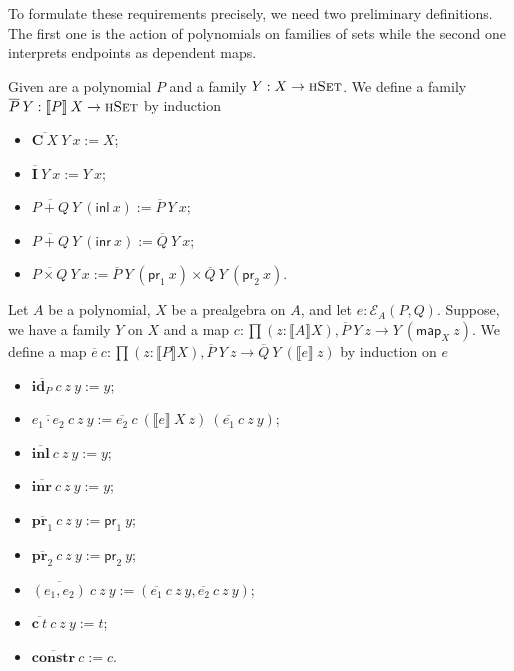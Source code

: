 \documentclass[9pt]{entcs}
\newcommand{\type}[1]{\textsc{#1}}
\newcommand{\term}[1]{\mathsf{#1}}
\newcommand{\constructor}[1]{\mathbf{#1}}
\newcommand{\nattranstxt}[1]{\mathsf{#1}}
\newcommand{\function}[1]{\mathsf{#1}}
\newcommand{\deprod}[3]{\prod(#1 : #2), #3} %
\newcommand{\hset}{\type{hSet}} %
\newcommand{\0}{\textbf{0}} %
\newcommand{\inl}{\term{inl}} %
\newcommand{\inr}{\term{inr}} %
\newcommand{\prl}{\term{pr}_1} %
\newcommand{\prr}{\term{pr}_2} %
\newcommand{\Def}{:=} %
\newcommand{\prlt}{\nattranstxt{pr}_1} %
\newcommand{\prrt}{\nattranstxt{pr}_2} %
\newcommand{\C}{\constructor{C}} %
\newcommand{\I}{\constructor{I}} %
\newcommand{\sumP}[2]{#1 + #2} %
\newcommand{\prodP}[2]{#1 \times #2} %
\newcommand{\ep}[3]{\mathcal{E}_{#1}(#2,#3)} %
\newcommand{\id}[1]{\constructor{id}_{#1}} %
\newcommand{\comp}[2]{#1 \cdot #2} %
\newcommand{\inle}{\constructor{inl}} %
\newcommand{\inre}{\constructor{inr}} %
\newcommand{\prle}{\constructor{pr}_1} %
\newcommand{\prre}{\constructor{pr}_2} %
\newcommand{\pair}[2]{(#1 , #2)} %
\newcommand{\Ce}{\constructor{c}} %
\newcommand{\constr}{\constructor{constr}} %
\newcommand{\semP}[1]{\llbracket #1 \rrbracket} %
\newcommand{\semE}[1]{\llbracket #1 \rrbracket} %
\newcommand{\constrA}[1]{\function{map}_{#1}} %
\newcommand{\polydact}[2]{\overline{#1} \> #2} %
\newcommand{\epdact}[2]{\overline{#1} \> #2} %
\begin{document}
To formulate these requirements precisely, we need two preliminary definitions.
The first one is the action of polynomials on families of sets while the second one interprets endpoints as dependent maps.

\begin{definition}
Given are a polynomial $P$ and a family $Y : X \rightarrow \hset$.
We define a family $\polydact{P}{Y} : \semP{P} \> X \rightarrow \hset$ by induction
\begin{itemize}
	\item $\polydact{\C \> X}{Y} \> x \Def X$;
	\item $\polydact{\I}{Y} \> x \Def Y \> x$;
	\item $\polydact{\sumP{P}{Q}}{Y} \> (\inl \> x) \Def \polydact{P}{Y} \> x$;
	\item $\polydact{\sumP{P}{Q}}{Y} \> (\inr \> x) \Def \polydact{Q}{Y} \> x$;
	\item $\polydact{\prodP{P}{Q}}{Y} \> x \Def \polydact{P}{Y} \> (\prl \> x) \times \polydact{Q}{Y} \> (\prr \> x)$.
\end{itemize}
\end{definition}

\begin{definition}
Let $A$ be a polynomial, $X$ be a prealgebra on $A$, and let $e : \ep{A}{P}{Q}$.
Suppose, we have a family $Y$ on $X$ and a map $c : \deprod{z}{\semP{A}{X}}{\polydact{P}{Y} \> z \rightarrow Y \> (\constrA{X} \> z)}$.
We define a map $\epdact{e}{c} : \deprod{z}{\semP{P}{X}}{\polydact{P}{Y} \> z \rightarrow \polydact{Q}{Y} \> (\semE{e} \> z)}$ by induction on $e$
\begin{itemize}
	\item $\epdact{\id{P}}{c} \> z \> y \Def y$;
	\item $\epdact{\comp{e_1}{e_2}}{c} \> z \> y \Def \epdact{e_2}{c} \> (\semE{e} \> X \> z) \> (\epdact{e_1}{c} \> z \> y)$;
	\item $\epdact{\inle}{c} \> z \> y \Def y$;
	\item $\epdact{\inre}{c} \> z \> y \Def y$;
	\item $\epdact{\prle}{c} \> z \> y \Def \prlt \> y$;
	\item $\epdact{\prre}{c} \> z \> y \Def \prrt \> y$;
	\item $\epdact{\pair{e_1}{e_2}}{c} \> z \> y \Def (\epdact{e_1}{c} \> z \> y , \epdact{e_2}{c} \> z \> y)$;
	\item $\epdact{\Ce \> t}{c} \> z \> y \Def t$;
	\item $\epdact{\constr}{c} \Def c$.
\end{itemize}
\end{definition}
\end{document}
